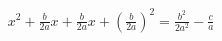 \documentclass[preview]{standalone}
\begin{document}
\begin{align*}
{x}^{2} + \frac{b}{2 a} x + \frac{b}{2 a} x + {\left( \frac{b}{2 a} \right)}^{2} = \frac{{b}^{2}}{2 {a}^{2}} - \frac{c}{a}
\end{align*}
\end{document}
